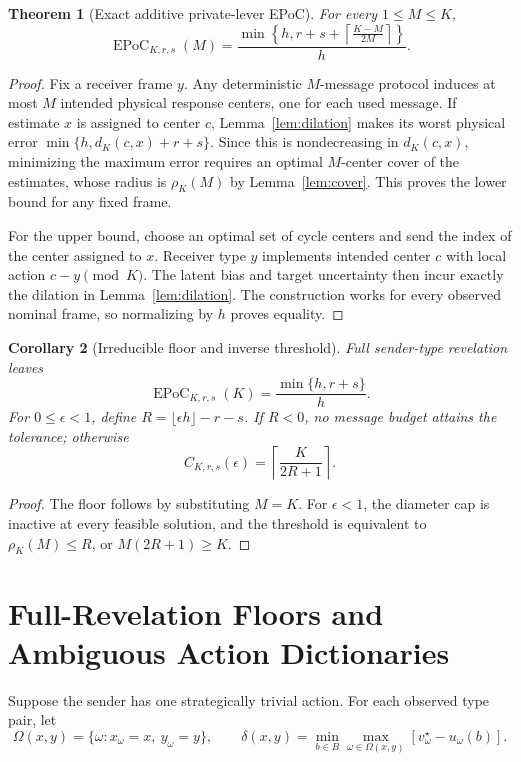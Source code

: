 \documentclass[letterpaper,10pt]{article}
\newtheorem{theorem}{Theorem}
\newtheorem{corollary}[theorem]{Corollary}
\newcommand{\EPoC}{\operatorname{EPoC}}
\begin{document}
\begin{theorem}[Exact additive private-lever EPoC]\label{thm:lever-supp}
For every $1\le M\le K$,
\[
\EPoC_{K,r,s}(M)=
\frac{\min\left\{h,
 r+s+\left\lceil\frac{K-M}{2M}\right\rceil\right\}}{h}.
\]
\end{theorem}
\begin{proof}
Fix a receiver frame $y$. Any deterministic $M$-message protocol induces at
most $M$ intended physical response centers, one for each used message. If
estimate $x$ is assigned to center $c$, Lemma~\ref{lem:dilation} makes its
worst physical error $\min\{h,d_K(c,x)+r+s\}$. Since this is nondecreasing in
$d_K(c,x)$, minimizing the maximum error requires an optimal $M$-center cover
of the estimates, whose radius is $\rho_K(M)$ by Lemma~\ref{lem:cover}. This
proves the lower bound for any fixed frame.

For the upper bound, choose an optimal set of cycle centers and send the index
of the center assigned to $x$. Receiver type $y$ implements intended center
$c$ with local action $c-y\pmod K$. The latent bias and target uncertainty then
incur exactly the dilation in Lemma~\ref{lem:dilation}. The construction works
for every observed nominal frame, so normalizing by $h$ proves equality.
\end{proof}

\begin{corollary}[Irreducible floor and inverse threshold]\label{cor:inverse}
Full sender-type revelation leaves
\[
\EPoC_{K,r,s}(K)=\frac{\min\{h,r+s\}}{h}.
\]
For $0\le\epsilon<1$, define
$R=\lfloor\epsilon h\rfloor-r-s$. If $R<0$, no message budget attains the
tolerance; otherwise
\[
C_{K,r,s}(\epsilon)=\left\lceil\frac{K}{2R+1}\right\rceil.
\]
\end{corollary}
\begin{proof}
The floor follows by substituting $M=K$. For $\epsilon<1$, the diameter cap is
inactive at every feasible solution, and the threshold is equivalent to
$\rho_K(M)\le R$, or $M(2R+1)\ge K$.
\end{proof}

\section{Full-Revelation Floors and Ambiguous Action Dictionaries}

Suppose the sender has one strategically trivial action. For each observed type
pair, let
\[
\Omega(x,y)=\{\omega:x_\omega=x,\ y_\omega=y\},\qquad
\delta(x,y)=\min_{b\in B}\max_{\omega\in\Omega(x,y)}
 [v_\omega^\star-u_\omega(b)].
\]
\end{document}
